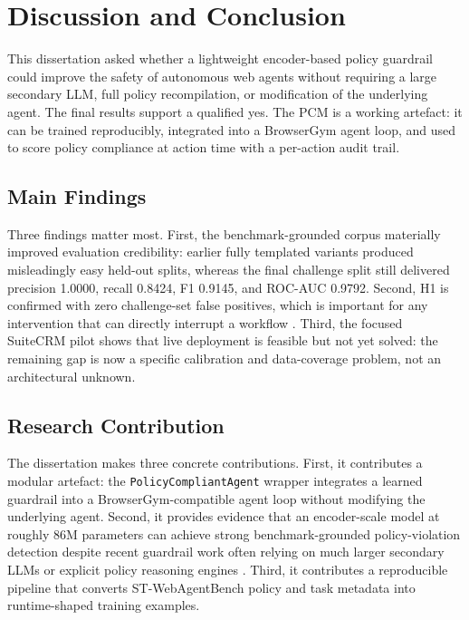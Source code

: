 \documentclass[12pt,a4paper]{article}
\begin{document}
\section{Discussion and Conclusion}
\label{ch:discussion}

This dissertation asked whether a lightweight encoder-based policy guardrail
could improve the safety of autonomous web agents without requiring a large
secondary LLM, full policy recompilation, or modification of the underlying
agent. The final results support a qualified yes. The PCM is a working
artefact: it can be trained reproducibly, integrated into a BrowserGym agent
loop, and used to score policy compliance at action time with a per-action
audit trail.

\subsection{Main Findings}

Three findings matter most. First, the benchmark-grounded corpus materially
improved evaluation credibility: earlier fully templated variants produced
misleadingly easy held-out splits, whereas the final challenge split still
delivered precision 1.0000, recall 0.8424, F1 0.9145, and ROC-AUC 0.9792.
Second, H1 is confirmed with zero challenge-set false positives, which is
important for any intervention that can directly interrupt a workflow
\citep{alahmadi2022fps}.
Third, the focused SuiteCRM pilot shows that live deployment is feasible but not
yet solved: the remaining gap is now a specific calibration and data-coverage
problem, not an architectural unknown.

\subsection{Research Contribution}

The dissertation makes three concrete contributions. First, it contributes a
modular artefact: the \texttt{PolicyCompliantAgent} wrapper integrates a learned
guardrail into a BrowserGym-compatible agent loop without modifying the
underlying agent. Second, it provides evidence that an encoder-scale model at
roughly 86M parameters can achieve strong benchmark-grounded policy-violation
detection despite recent guardrail work often relying on much larger secondary
LLMs or explicit policy reasoning engines
\citep{xiang2024guardagent,luo2025agrail,chen2025shieldagent}. Third, it
contributes a reproducible pipeline that converts ST-WebAgentBench policy and
task metadata into runtime-shaped training examples.
\end{document}
